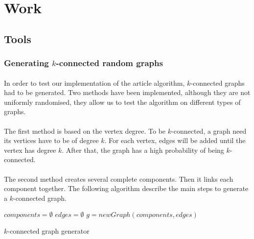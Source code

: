 \section{Work}

\subsection{Tools}
\subsubsection{Generating $k$-connected random graphs}
\paragraph{}
In order to test our implementation of the article algorithm, $k$-connected 
graphs had to be generated. Two methods have been implemented, although they are not
uniformly randomised, they allow us to test the algorithm on different types
of graphs.

\paragraph{}
The first method is based on the vertex degree. To be $k$-connected, a graph need
its vertices have to be of degree $k$. For each vertex, edges will be added until
the vertex has degree $k$. After that, the graph has a high probability of
being $k$-connected.

\paragraph{}
The second method creates several complete components. Then it links each component
together. The following algorithm describe the main steps to generate a
$k$-connected graph.

\begin{algorithm}[!h]
    $components = \emptyset$\;
    $edges = \emptyset$\;
    $g = newGraph(components, edges)$\;
    \;
    \caption{$k$-connected graph generator}
\end{algorithm}

